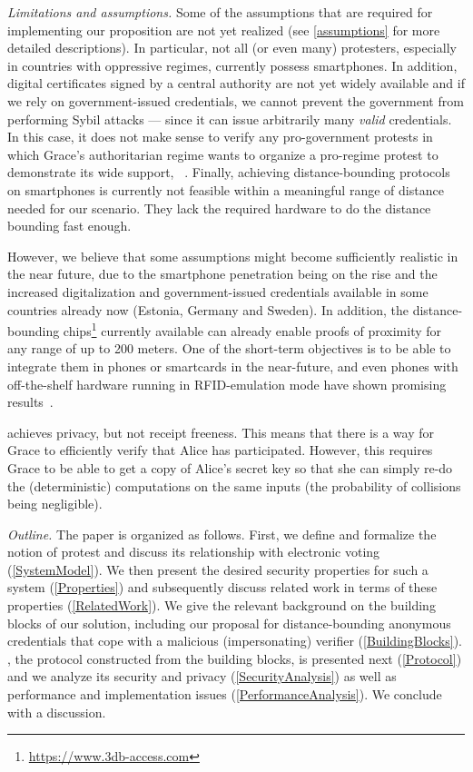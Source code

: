 \emph{Limitations and assumptions.} Some of the assumptions that are required 
for implementing our proposition are not yet realized (see \cref{assumptions} 
for more detailed descriptions). In particular, not all (or even many) 
protesters, especially in countries with oppressive regimes, currently possess 
smartphones.
In addition, digital certificates signed by a central authority are not yet widely available and if we rely on government-issued credentials, we cannot prevent the government from performing Sybil attacks --- since it can issue arbitrarily many \emph{valid} credentials. 
In this case, it does not make sense to verify any pro-government protests in 
which Grace's authoritarian regime wants to organize a pro-regime protest to 
demonstrate its wide support, 
\eg~\cite{AlJazeeraOnVenezuela2017,VenezuelanStateWorkersCalledToParticipate}.
Finally, achieving distance-bounding protocols on smartphones is currently not 
feasible within a meaningful range of distance needed for our scenario.
They lack the required hardware to do the distance bounding fast enough.

However, we believe that some assumptions might become sufficiently realistic in 
the near future, due to the smartphone penetration being on the rise and the 
increased digitalization and government-issued credentials available in some 
countries already now (\eg Estonia, Germany and Sweden).
In addition, the distance-bounding 
chips\footnote{\url{https://www.3db-access.com}} currently available can already 
enable proofs of proximity for any range of up to 200 meters.
One of the short-term objectives is to be able to integrate them in phones or smartcards in the near-future, and even phones with off-the-shelf hardware running in RFID-emulation mode have shown promising results~\cite{DBonSmartphones}.

\PRIVO achieves privacy, but not receipt freeness.
This means that there is a way for Grace to efficiently verify that Alice has 
participated.
However, this requires Grace to be able to get a copy of Alice's secret key so that she can simply re-do the (deterministic) computations on the same inputs (the probability of collisions being negligible).

\emph{Outline.} The paper is organized as follows. First, we define and 
formalize the notion of protest and discuss its relationship with electronic 
voting (\cref{SystemModel}).  We then present the desired security properties 
for such a system (\cref{Properties}) and subsequently discuss related work in 
terms of these properties (\cref{RelatedWork}). We give the relevant background 
on the building blocks of our solution, including our proposal for 
distance-bounding anonymous credentials that cope with a malicious 
(impersonating) verifier (\cref{BuildingBlocks}). \PRIVO, the protocol 
constructed from the building blocks, is presented next (\cref{Protocol}) and we 
analyze its security and privacy (\cref{SecurityAnalysis}) as well as 
performance and implementation issues (\cref{PerformanceAnalysis}). We conclude 
with a discussion. 
